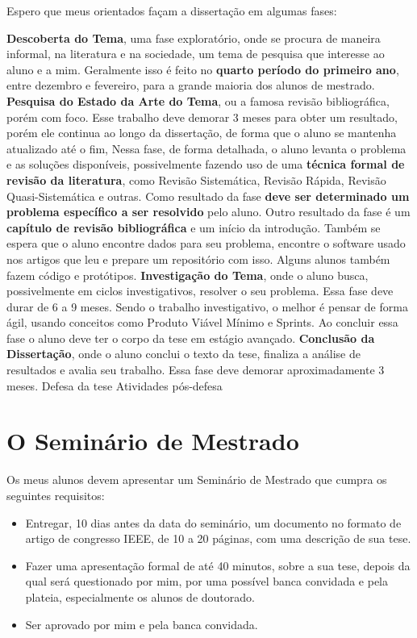 \documentclass{book}
\begin{document}
Espero que meus orientados façam a dissertação em algumas fases:
\begin{outline}
    \1 \textbf{Descoberta do Tema}, uma fase exploratório, onde se procura de maneira informal, na literatura e na sociedade, um tema de pesquisa que interesse ao aluno e a mim. 
    \2 Geralmente isso é feito no \textbf{quarto período do primeiro ano}, entre dezembro e fevereiro, para a grande maioria dos alunos de mestrado. 
    \1 \textbf{Pesquisa do Estado da Arte do Tema}, ou a famosa revisão bibliográfica, porém com foco. 
    \2 Esse trabalho deve demorar 3 meses para obter um resultado, porém ele continua ao longo da dissertação, de forma que o aluno se mantenha atualizado até o fim,
    \2 Nessa fase, de forma detalhada, o aluno levanta o problema e as soluções disponíveis, possivelmente fazendo uso de uma \textbf{técnica formal de revisão da literatura}, como Revisão Sistemática, Revisão Rápida, Revisão Quasi-Sistemática e outras. 
    \2 Como resultado da fase \textbf{deve ser determinado um problema específico a ser resolvido} pelo aluno. 
    \2 Outro resultado da fase é um \textbf{capítulo de revisão bibliográfica} e um início da introdução.
    \2 Também se espera que o aluno encontre dados para seu problema, encontre o software usado nos artigos que leu e prepare um repositório com isso. 
    \2 Alguns alunos também fazem código e protótipos.
    \1 \textbf{Investigação do Tema}, onde o aluno busca, possivelmente em ciclos investigativos, resolver o seu problema. 
    \2 Essa fase deve durar de 6 a 9 meses.
    \2 Sendo o trabalho investigativo, o melhor é pensar de forma ágil, usando conceitos como Produto Viável Mínimo e Sprints.
    \2 Ao concluir essa fase o aluno deve ter o corpo da tese em estágio avançado.
    \1 \textbf{Conclusão da Dissertação}, onde o aluno conclui o texto da tese, finaliza a análise de resultados e avalia seu trabalho.
    \2 Essa fase deve demorar aproximadamente 3 meses.
    \1 Defesa da tese
    \1 Atividades pós-defesa
\end{outline}




\chapter{O Seminário de Mestrado}

Os meus alunos devem apresentar um Seminário de Mestrado que cumpra os seguintes requisitos:
\begin{itemize}
    \item Entregar, 10 dias antes da data do seminário, um documento no formato de artigo de congresso IEEE, de 10 a 20 páginas, com uma descrição de sua tese.
    \item Fazer uma apresentação formal de até 40 minutos, sobre a sua tese, depois da qual será questionado por mim, por uma possível banca convidada e pela plateia, especialmente os alunos de doutorado.
    \item Ser aprovado por mim e pela banca convidada.
\end{itemize}
\end{document}
